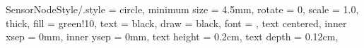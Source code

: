 \def\BayStationPosition{(0,0)}
%
\def\SensorOnePosition{(-1.2,	-0.3)}
\def\SensorTwoPosition{(-1.5,	0.3)}
\def\SensorThreePosition{(-1.3,	1.1)}
\def\SensorFourPosition{(-0.3,	1.6)}
\def\SensorFivePosition{(0.3,	2.2)}
\def\SensorSixPosition{(0.7,	1.7)}
\def\SensorSevenPosition{(1.7,	1.8)}
\def\SensorEightPosition{(1.6,	0.8)}
\def\SensorNinePosition{(2.1,	0.3)}
\def\SensorTenPosition{(1.8,	-0.4)}
\def\SensorElevenPosition{(1.0,	-0.7)}
\def\SensorTwelvePosition{(1.0,	-1.4)}
\def\SensorThirteenPosition{(0.0,	-2.2)}
\def\SensorFourteenPosition{(-0.3,	-1.4)}
\def\SensorFifteenPosition{(-1.3,	-1.9)}







\tikzset
{
	SensorNodeStyle/.style =
	{
		circle,									%
		minimum size	= 4.5mm,				%
		rotate			= 0,					%
		scale			= 1.0,					%
		thick,									%
		fill			= green!10,				%
		text			= black,				%
		draw			= black,				%
		font			= \scriptsize,				%
		text centered,							%
		inner xsep		= 0mm,					%
		inner ysep		= 0mm,					%
		text height		= 0.2cm,
		text depth		= 0.12cm,
	}
}






